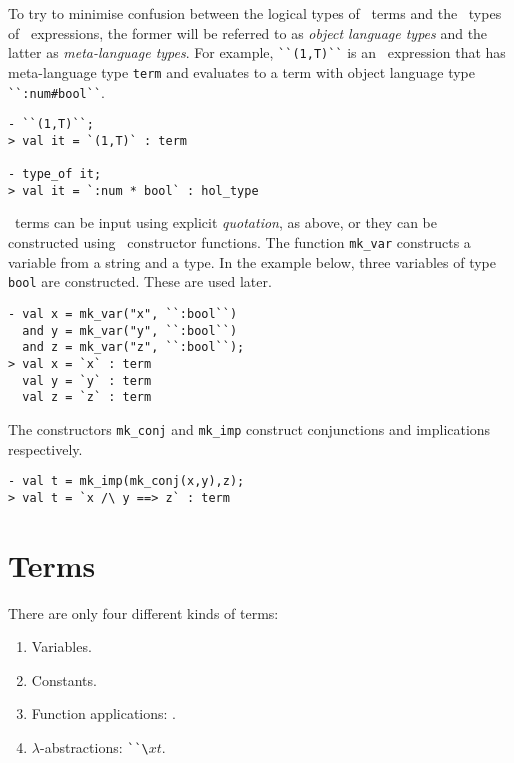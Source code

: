 To try to minimise confusion between the logical types of \HOL\ terms and
the \ML\ types of \ML\ expressions, the former will be referred to as {\it object
language types\/} and the latter as {\it meta-language types\/}.  For example,
{\small\verb|``(1,T)``|} is an \ML\ expression that has meta-language type
{\small\verb|term|} and evaluates to a term with object language type
{\small\verb|``:num#bool``|}.


\begin{session}
\begin{verbatim}
- ``(1,T)``;
> val it = `(1,T)` : term

- type_of it;
> val it = `:num * bool` : hol_type
\end{verbatim}
\end{session}

\HOL\ terms can be input using explicit {\it quotation\/}, as above, or
they can be constructed using \ML\ constructor functions. The function
{\small\verb|mk_var|} constructs a variable from a string and a type.  In
the example below, three variables of type {\small\verb|bool|} are
constructed.  These are used later.

\begin{session}
\begin{verbatim}
- val x = mk_var("x", ``:bool``)
  and y = mk_var("y", ``:bool``)
  and z = mk_var("z", ``:bool``);
> val x = `x` : term
  val y = `y` : term
  val z = `z` : term
\end{verbatim}
\end{session}

The constructors {\small\verb|mk_conj|} and {\small\verb|mk_imp|} construct
conjunctions and implications respectively.

\begin{session}
\begin{verbatim}
- val t = mk_imp(mk_conj(x,y),z);
> val t = `x /\ y ==> z` : term
\end{verbatim}
\end{session}

\section{Terms}

There are only four different kinds of terms:
\begin{enumerate}
\item Variables.
\item Constants.
\item Function applications: .
\item $\lambda$-abstractions: {\small\verb|``\|}$x$$t$.
\end{enumerate}

